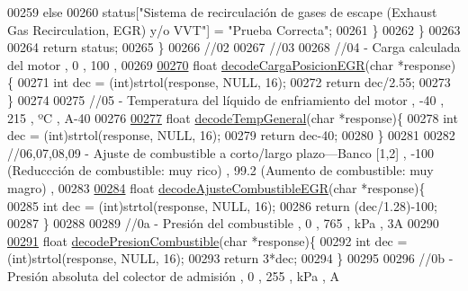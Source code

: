 \begin{DoxyCode}
00259             \textcolor{keywordflow}{else}
00260                 status[\textcolor{stringliteral}{"Sistema de recirculación de gases de escape (Exhaust Gas Recirculation, EGR) y/o
       VVT"}] = \textcolor{stringliteral}{"Prueba Correcta"};
00261         \}
00262     \}
00263 
00264     \textcolor{keywordflow}{return} status;
00265 \}
00266 \textcolor{comment}{//02}
00267 \textcolor{comment}{//03}
00268 \textcolor{comment}{//04 - Carga calculada del motor , 0 , 100 , %
00269 
\hyperlink{decoders_8hpp_adbe68794075963c37e654d53b8a46f68}{00270} \textcolor{keywordtype}{float} \hyperlink{decoders_8cpp_adbe68794075963c37e654d53b8a46f68}{decodeCargaPosicionEGR}(\textcolor{keywordtype}{char} *response)\{
00271     \textcolor{keywordtype}{int} dec = (int)strtol(response, NULL, 16);
00272     \textcolor{keywordflow}{return} dec/2.55;
00273 \}
00274 
00275 \textcolor{comment}{//05 - Temperatura del líquido de enfriamiento del motor , -40 , 215 , ºC , A-40}
00276 
\hyperlink{decoders_8hpp_af581438645d7ff67766fa2e5eba5eaf9}{00277} \textcolor{keywordtype}{float} \hyperlink{decoders_8cpp_af581438645d7ff67766fa2e5eba5eaf9}{decodeTempGeneral}(\textcolor{keywordtype}{char} *response)\{
00278     \textcolor{keywordtype}{int} dec = (int)strtol(response, NULL, 16);
00279     \textcolor{keywordflow}{return} dec-40;
00280 \}
00281 
00282 \textcolor{comment}{//06,07,08,09 - Ajuste de combustible a corto/largo plazo—Banco [1,2] , -100 (Reduccción de combustible:
       muy rico) , 99.2 (Aumento de combustible: muy magro) , %
00283 
\hyperlink{decoders_8hpp_aeee9e6d8511a934b3a3644b19de3f2b7}{00284} \textcolor{keywordtype}{float} \hyperlink{decoders_8cpp_aeee9e6d8511a934b3a3644b19de3f2b7}{decodeAjusteCombustibleEGR}(\textcolor{keywordtype}{char} *response)\{
00285     \textcolor{keywordtype}{int} dec = (int)strtol(response, NULL, 16);
00286     \textcolor{keywordflow}{return} (dec/1.28)-100;
00287 \}
00288 
00289 \textcolor{comment}{//0a - Presión del combustible , 0 , 765 , kPa , 3A}
00290 
\hyperlink{decoders_8hpp_ab1c03e72734d4127a1c48f3b5a44a2e2}{00291} \textcolor{keywordtype}{float} \hyperlink{decoders_8cpp_ab1c03e72734d4127a1c48f3b5a44a2e2}{decodePresionCombustible}(\textcolor{keywordtype}{char} *response)\{
00292     \textcolor{keywordtype}{int} dec = (int)strtol(response, NULL, 16);
00293     \textcolor{keywordflow}{return} 3*dec;
00294 \}
00295 
00296 \textcolor{comment}{//0b - Presión absoluta del colector de admisión , 0 , 255 , kPa , A}
}}
\end{DoxyCode}
